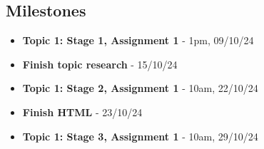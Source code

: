 \documentclass{article}
\begin{document}
        

\subsection{Milestones}
    \begin{itemize}
        \item \textbf{Topic 1: Stage 1, Assignment 1} - 1pm, 09/10/24
        \item \textbf{Finish topic research} - 15/10/24
        \item \textbf{Topic 1: Stage 2, Assignment 1} - 10am, 22/10/24
        \item \textbf{Finish HTML} - 23/10/24
        \item \textbf{Topic 1: Stage 3, Assignment 1} - 10am, 29/10/24
    \end{itemize}
\end{document}

